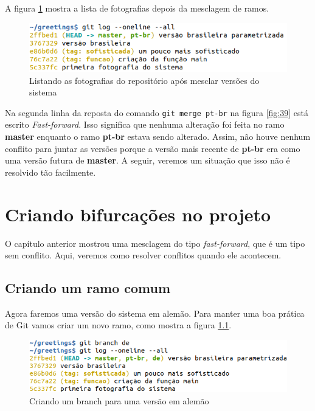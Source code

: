 \documentclass[a4paper]{book}
\begin{document}
A figura \ref{fig:40} mostra a lista de fotografias
depois da mesclagem de ramos.

\begin{figure}[ht]
\caption{Listando as fotografias do repositório após mesclar versões do sistema}
\label{fig:40}
\centering
\includegraphics[scale=0.6,left]{"images/40-Listando as fotografias do repositório após mesclar versões do sistema.png"}
\end{figure}

Na segunda linha da reposta do comando
\texttt{git merge pt-br} na figura \ref{fig:39} 
está escrito \textit{Fast-forward}.
Isso significa que nenhuma alteração foi feita no
ramo \textbf{master} enquanto o ramo \textbf{pt-br}
estava sendo alterado.
Assim, não houve nenhum conflito para juntar as versões
porque a versão mais recente de \textbf{pt-br}
era como uma versão futura de \textbf{master}.
A seguir, veremos um situação que isso não é resolvido tão
facilmente.

\chapter{Criando bifurcações no projeto}

O capítulo anterior mostrou uma mesclagem do tipo
\textit{fast-forward}, que é um tipo sem conflito.
Aqui, veremos como resolver conflitos quando ele acontecem.

\section{Criando um ramo comum}

Agora faremos uma versão do sistema em alemão.
Para manter uma boa prática de Git vamos criar um novo
ramo, como mostra a figura \ref{fig:41}.

\begin{figure}[ht]
\caption{Criando um branch para uma versão em alemão}
\label{fig:41}
\centering
\includegraphics[scale=0.6,left]{"images/41-Criando um branch para uma versão em alemão.png"}
\end{figure}
\end{document}
